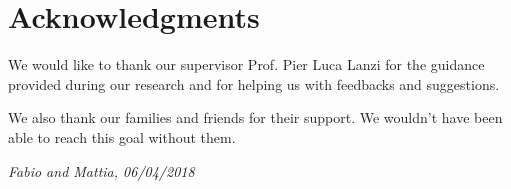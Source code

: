 \chapter*{Acknowledgments}

We would like to thank our supervisor Prof. Pier Luca Lanzi for the guidance provided during our research and for helping us with feedbacks and suggestions.

\medskip\noindent
We also thank our families and friends for their support. We wouldn't have been able to reach this goal without them.

\begin{flushright}
\textit{Fabio and Mattia, 06/04/2018}
\end{flushright}
